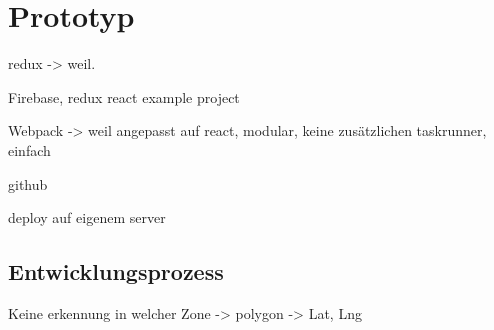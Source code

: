 \chapter{Prototyp}
\label{sec:prototyp}

redux -> weil.

Firebase, redux react example project

Webpack -> weil angepasst auf react, modular, keine zusätzlichen taskrunner, einfach

github

deploy auf eigenem server

\section{Entwicklungsprozess}

Keine erkennung in welcher Zone -> polygon -> Lat, Lng
